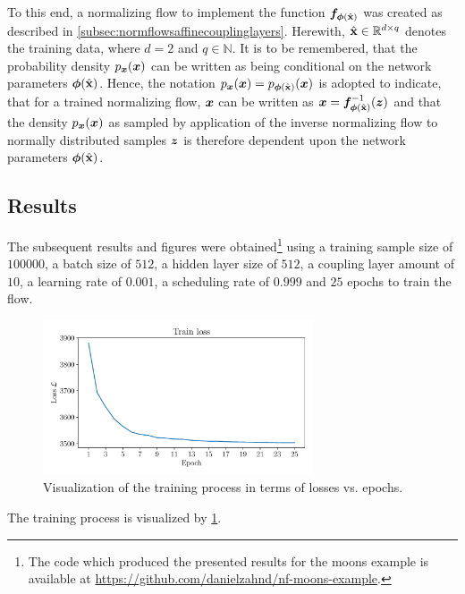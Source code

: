 \documentclass[a4paper,12pt]{report}
\begin{document}
To this end, a normalizing flow to implement the function $\bm{f}_{\bm{\phi}(\hat{\boldsymbol{\mathbf{x}}})}$ was created as described in \cref{subsec:normflowsaffinecouplinglayers}. Herewith, $\hat{\boldsymbol{\mathbf{x}}} \in \mathbb{R}^{d\times q}$ denotes the training data, where $d=2$ and $q \in \mathbb{N}$. It is to be remembered, that the probability density $p_{\bm{x}}(\bm{x})$ can be written as being conditional on the network parameters $\bm{\phi}(\hat{\boldsymbol{\mathbf{x}}})$. Hence, the notation $p_{\bm{x}}(\bm{x}) = p_{\bm{\phi}(\hat{\boldsymbol{\mathbf{x}}})}(\bm{x})$ is adopted to indicate, that for a trained normalizing flow, $\bm{x}$ can be written as $\bm{x} = \bm{f}^{-1}_{\bm{\phi}(\hat{\boldsymbol{\mathbf{x}}})}(\bm{z})$ and that the density $p_{\bm{x}}(\bm{x})$ as sampled by application of the inverse normalizing flow to normally distributed samples $\bm{z}$ is therefore dependent upon the network parameters $\bm{\phi}(\hat{\boldsymbol{\mathbf{x}}})$.

\subsection{Results}
The subsequent results and figures were obtained\footnote{The code which produced the presented results for the moons example is available at \url{https://github.com/danielzahnd/nf-moons-example}.} using a training sample size of $100000$, a batch size of $512$, a hidden layer size of $512$, a coupling layer amount of $10$, a learning rate of $0.001$, a scheduling rate of $0.999$ and $25$ epochs to train the flow.
\begin{figure}[h!]
\centering
\includegraphics[width=8cm]{figures/nf-moons-example-loss}
\caption{Visualization of the training process in terms of losses vs. epochs.}
\label{fig:nf-moons-example-loss}
\end{figure}
The training process is visualized by \cref{fig:nf-moons-example-loss}.
\end{document}
